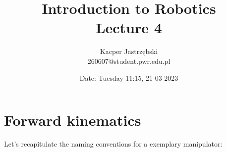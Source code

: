 \documentclass[12pt, a4paper]{extarticle}
\title{
	Introduction to Robotics \\
	\vspace{\baselineskip}
	\large
	\textbf{Lecture 4}
}
\author{
	Kacper Jastrzębski\\
	260607@student.pwr.edu.pl
}
\date{Date: Tuesday 11:15, 21-03-2023}
\begin{document}
	\maketitle
	\vspace{1.5cm}

	\tableofcontents

	\pagebreak

	\section{Forward kinematics}

	Let's recapitulate the naming conventions for a exemplary manipulator:


	\newcommand{\nvar}[2]{%
		\newlength{#1}
		\setlength{#1}{#2}
	}

	\nvar{\dg}{0.3cm}
	\def\dw{0.25}\def\dh{0.5}
	\nvar{\ddx}{1.5cm}

	\def\link{\draw [double distance=1.5mm, very thick] (0,0)--}
	\def\joint{%
		\filldraw [fill=white] (0,0) circle (5pt);
		\fill[black] circle (2pt);
	}
	\def\grip{%
		\draw[ultra thick](0cm,\dg)--(0cm,-\dg);
		\fill (0cm, 0.5\dg)+(0cm,1.5pt) -- +(0.6\dg,0cm) -- +(0pt,-1.5pt);
		\fill (0cm, -0.5\dg)+(0cm,1.5pt) -- +(0.6\dg,0cm) -- +(0pt,-1.5pt);
	}
	\def\robotbase{%
		\draw[rounded corners=8pt] (-\dw,-\dh)-- (-\dw, 0) --
		(0,\dh)--(\dw,0)--(\dw,-\dh);
		\draw (-0.5,-\dh)-- (0.5,-\dh);
		\fill[pattern=north east lines] (-0.5,-1) rectangle (0.5,-\dh);
	}

	\newcommand{\angann}[2]{%
		\begin{scope}[red]
			\draw [dashed, red] (0,0) -- (1.2\ddx,0pt);
			\draw [->, shorten >=3.5pt] (\ddx,0pt) arc (0:#1:\ddx);
			\node at (#1/2-2:\ddx+8pt) {#2};
		\end{scope}
	}

	\newcommand{\lineann}[4][0.5]{%
		\begin{scope}[rotate=#2, blue,inner sep=2pt]
			\draw[dashed, blue!40] (0,0) -- +(0,#1)
			node [coordinate, near end] (a) {};
			\draw[dashed, blue!40] (#3,0) -- +(0,#1)
			node [coordinate, near end] (b) {};
			\draw[|<->|] (a) -- node[fill=white] {#4} (b);
		\end{scope}
	}
\end{document}
